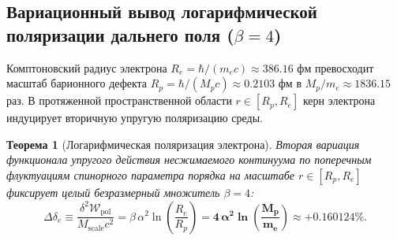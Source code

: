 \documentclass[11pt,a4paper]{article}
\newtheorem{theorem}{Теорема}[section]
\theoremstyle{definition}
\theoremstyle{remark}
\begin{document}
\subsection{Вариационный вывод логарифмической поляризации дальнего поля ($\beta = 4$)}
Комптоновский радиус электрона $R_e = \hbar / (m_e c) \approx 386.16$ фм превосходит масштаб барионного дефекта $R_p = \hbar / (M_p c) \approx 0.2103$ фм в $M_p/m_e \approx 1836.15$ раз. В протяженной пространственной области $r \in [R_p, R_e]$ керн электрона индуцирует вторичную упругую поляризацию среды.

\begin{theorem}[Логарифмическая поляризация электрона]
Вторая вариация функционала упругого действия несжимаемого континуума по поперечным флуктуациям спинорного параметра порядка на масштабе $r \in [R_p, R_e]$ фиксирует целый безразмерный множитель $\beta = 4$:
\begin{equation}
    \Delta \delta_e \equiv \frac{\delta^2 \mathcal{W}_{\mathrm{pol}}}{M_{\mathrm{scale}} c^2} = \beta \, \alpha^2 \ln\left( \frac{R_e}{R_p} \right) = \mathbf{4 \, \alpha^2 \ln\left( \frac{M_p}{m_e} \right)} \approx \mathbf{+0.160124\%}.
    \label{eq:electron_log}
\end{equation}
\end{theorem}
\end{document}
